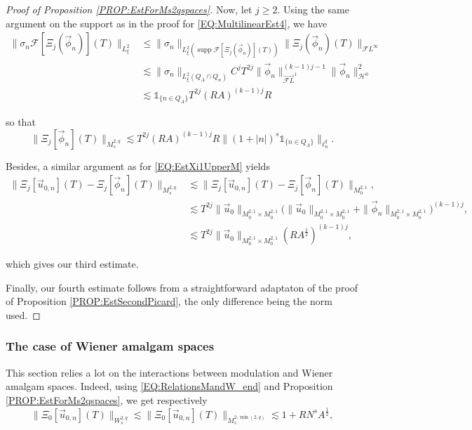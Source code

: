 \documentclass[letterpaper, 11pt,  reqno]{amsart}
\DeclareMathOperator*{\supp}{supp}
\newcommand{\1}{\hspace{0.5mm}\text{I}\hspace{0.5mm}}
\newcommand{\noi}{\noindent}
\newcommand{\FL}{\mathcal{F}L} %
\newcommand{\FLv}{\overrightarrow{\mathcal{F}L}}
\renewcommand{\H}{\mathcal{H}}
\newcommand{\F}{\mathcal{F}}
\newcommand{\s}{\sigma}
\newcommand{\les}{\lesssim}
\numberwithin{equation}{section}
\numberwithin{theorem}{section}
\newcommand{\abs}[1]{\lvert#1\rvert}
\begin{document}
\begin{proof}[Proof of Proposition \ref{PROP:EstForMs2qspaces}]
Now, let $j \geq 2$. Using the same argument on the support as in the proof for \eqref{EQ:MultilinearEst4}, we have 
\begin{align*}
\| \s_n \F[\Xi_j (\vec{\phi}_n)](T) \|_{L^2_\xi} & \leq \| \s_n \|_{L^2_\xi (\supp \F[ \Xi_j  (\vec{\phi}_n)](T))} \| \Xi_j (\vec{\phi}_n) (T) \|_{\FL^\infty} \\
	& \les \| \s_n\|_{L^2_\xi (Q_A \cap Q_n)} C^j T^{2j} \| \vec{\phi}_n \|^{(k-1)j-1}_{\FLv^1} \| \vec{\phi}_n \|^2_{\H^0} \\
	& \les \mathds{1}_{\{ n \in Q_A\}} T^{2j}(RA)^{(k-1)j} R
\end{align*}

\noi so that
$$
\| \Xi_j [\vec{\phi}_n] (T) \|_{M_s^{2,q}}  \les T^{2j} (RA)^{(k-1)j} R \| (1 + \abs{n})^s \mathds{1}_{\{ n \in Q_A \}} \|_{\ell^q_n}.
$$

\noi Besides, a similar argument as for \eqref{EQ:EstXi1UpperM} yields
\begin{align*}
\|\Xi_j [\vec{u}_{0, n}] (T) - \Xi_j [\vec{\phi}_{ n}] (T)  \|_{M_s^{2,q}} & \les \|\Xi_j [\vec{u}_{0, n}] (T) - \Xi_j [\vec{\phi}_{ n}] (T)  \|_{M_0^{2,1}}, \\
	& \les T^{2j} \| \vec{u}_0 \|_{M^{2,1}_0 \times M^{2,1}_0} \big( \| \vec{u}_0 \|_{M^{2,1}_0 \times M^{2,1}_0} + \| \vec{\phi}_n \|_{M^{2,1}_0 \times M^{2,1}_0} \big)^{(k-1)j}, \\
	& \les T^{2j} \| \vec{u}_0 \|_{M^{2,1}_0 \times M^{2,1}_0} (RA^{\frac 12})^{(k-1)j},
\end{align*}


\noi which gives our third estimate.

Finally, our fourth estimate follows from a straightforward adaptaton of the proof of Proposition \ref{PROP:EstSecondPicard}, the only difference being the norm used.

\end{proof}


\subsubsection{The case of Wiener amalgam spaces}

This section relies a lot on the interactions between modulation and Wiener amalgam spaces.  Indeed, using \eqref{EQ:RelationsMandW_end} and Proposition \ref{PROP:EstForMs2qspaces}, we get respectively
\begin{equation}
\label{EQ:EstForWs2q_Xi0}
\| \Xi_0 [\vec{u}_{0,n}](T) \|_{W_s^{2,q}} \les \| \Xi_0 [\vec{u}_{0,n}](T) \|_{M_s^{2,\min(2,q)}} \les 1 + R N^s A^{\frac 12},
\end{equation}
\end{document}
